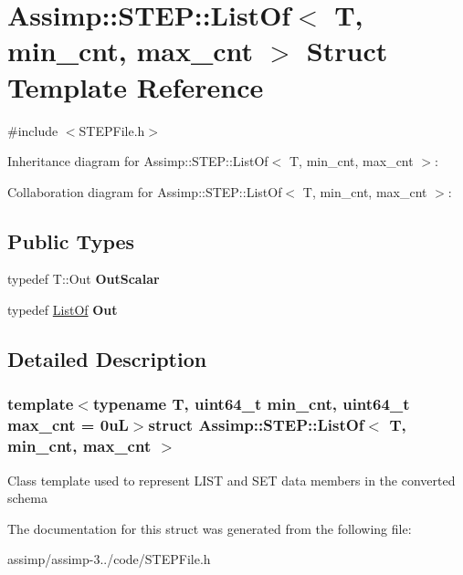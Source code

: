 \hypertarget{struct_assimp_1_1_s_t_e_p_1_1_list_of}{\section{Assimp\+:\+:S\+T\+E\+P\+:\+:List\+Of$<$ T, min\+\_\+cnt, max\+\_\+cnt $>$ Struct Template Reference}
\label{struct_assimp_1_1_s_t_e_p_1_1_list_of}
}


{\ttfamily \#include $<$S\+T\+E\+P\+File.\+h$>$}



Inheritance diagram for Assimp\+:\+:S\+T\+E\+P\+:\+:List\+Of$<$ T, min\+\_\+cnt, max\+\_\+cnt $>$\+:


Collaboration diagram for Assimp\+:\+:S\+T\+E\+P\+:\+:List\+Of$<$ T, min\+\_\+cnt, max\+\_\+cnt $>$\+:
\subsection*{Public Types}
\begin{DoxyCompactItemize}
\item 
\hypertarget{struct_assimp_1_1_s_t_e_p_1_1_list_of_aa901476bf5830eb0af8bf03fd36993a7}{typedef T\+::\+Out {\bfseries Out\+Scalar}}\label{struct_assimp_1_1_s_t_e_p_1_1_list_of_aa901476bf5830eb0af8bf03fd36993a7}

\item 
\hypertarget{struct_assimp_1_1_s_t_e_p_1_1_list_of_a70129cc5d3c886e0c8138e9a3d17affa}{typedef \hyperlink{struct_assimp_1_1_s_t_e_p_1_1_list_of}{List\+Of} {\bfseries Out}}\label{struct_assimp_1_1_s_t_e_p_1_1_list_of_a70129cc5d3c886e0c8138e9a3d17affa}

\end{DoxyCompactItemize}


\subsection{Detailed Description}
\subsubsection*{template$<$typename T, uint64\+\_\+t min\+\_\+cnt, uint64\+\_\+t max\+\_\+cnt = 0u\+L$>$struct Assimp\+::\+S\+T\+E\+P\+::\+List\+Of$<$ T, min\+\_\+cnt, max\+\_\+cnt $>$}

Class template used to represent L\+I\+S\+T and S\+E\+T data members in the converted schema 

The documentation for this struct was generated from the following file\+:\begin{DoxyCompactItemize}
\item 
assimp/assimp-\/3../code/S\+T\+E\+P\+File.\+h\end{DoxyCompactItemize}
